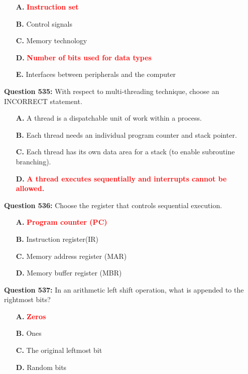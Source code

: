 \documentclass[12pt,a4paper]{article}
\begin{document}
\begin{itemize}
    \item[\textbf{A.}] \textcolor{red}{\textbf{Instruction set}}
    \item[\textbf{B.}] Control signals
    \item[\textbf{C.}] Memory technology
    \item[\textbf{D.}] \textcolor{red}{\textbf{Number of bits used for data types}}
    \item[\textbf{E.}] Interfaces between peripherals and the computer
\end{itemize}

\vspace{0.5cm}

\textbf{Question 535:} With respect to multi-threading technique, choose an INCORRECT statement.

\begin{itemize}
    \item[\textbf{A.}] A thread is a dispatchable unit of work within a process.
    \item[\textbf{B.}] Each thread needs an individual program counter and stack pointer.
    \item[\textbf{C.}] Each thread has its own data area for a stack (to enable subroutine branching).
    \item[\textbf{D.}] \textcolor{red}{\textbf{A thread executes sequentially and interrupts cannot be allowed.}}
\end{itemize}

\vspace{0.5cm}

\textbf{Question 536:} Choose the register that controls sequential execution.

\begin{itemize}
    \item[\textbf{A.}] \textcolor{red}{\textbf{Program counter (PC)}}
    \item[\textbf{B.}] Instruction register(IR)
    \item[\textbf{C.}] Memory address register (MAR)
    \item[\textbf{D.}] Memory buffer register (MBR)
\end{itemize}

\vspace{0.5cm}

\textbf{Question 537:} In an arithmetic left shift operation, what is appended to the rightmost bits?

\begin{itemize}
    \item[\textbf{A.}] \textcolor{red}{\textbf{Zeros}}
    \item[\textbf{B.}] Ones
    \item[\textbf{C.}] The original leftmost bit
    \item[\textbf{D.}] Random bits
\end{itemize}
\end{document}
